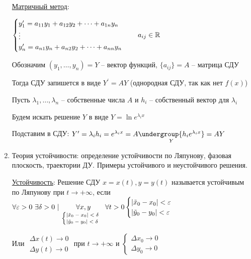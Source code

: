 \documentclass[12pt]{article}
\begin{document}
\begin{enumerate}
        \hyperlink{matrixmethod}{Матричный метод}: 

        
        $\begin{cases}
            y^{\prime}_1 = a_{11}y_1 + a_{12}y_2 + \dots + a_{1n} y_n \\
            \vdots \\
            y^{\prime}_n = a_{n1}y_n + a_{n2}y_2 + \dots + a_{nn} y_n
        \end{cases} \quad a_{ij} \in \mathbb{R}$

        Обозначим $(y_1, \dots, y_n) = Y$ -- вектор функций, $\{a_{ij}\} = A$ -- матрица СДУ

        Тогда СДУ запишется в виде $Y^\prime = AY$ (однородная СДУ, так как нет $f(x)$)

        Пусть $\lambda_1, \dots, \lambda_n$ -- собственные числа $A$ и $h_i$ -- собственный вектор для $\lambda_i$

        Будем искать решение $Y$ в виде $Y = \ln e^{\lambda_i x}$

        Подставим в СДУ: $Y^\prime = \lambda_i h_i = e^{\lambda_i x} = A \underset{Y}{\undergroup{h_i e^{\lambda_i x}}} = AY$


        \item Теория устойчивости: определение устойчивости по Ляпунову, фазовая плоскость, траектории ДУ. Примеры устойчивого и неустойчивого решения.

        \hyperlink{stability}{Устойчивость}: Решение СДУ $x = x(t), y = y(t)$ называется устойчивым по Ляпунову при $t \to +\infty$, если
        $\forall \varepsilon > 0 \ \exists \delta > 0 \ | \ \underset{ \scriptsize \begin{cases}|\tilde{x}_0 - x_0| < \delta \\ |\tilde{y}_0 - y_0| < \delta\end{cases}}{\forall x, y} \forall t > 0 \begin{cases}|\tilde{x}_0 - x_0| < \varepsilon \\ |\tilde{y}_0 - y_0| < \varepsilon\end{cases}$

        Или $\begin{matrix}\Delta x (t) \to 0 \\ \Delta y (t) \to 0\end{matrix}$ при $t \to +\infty$ и $\begin{cases}\Delta x_0 \to 0 \\ \Delta y_0 \to 0\end{cases}$


    \end{enumerate}
\end{document}
